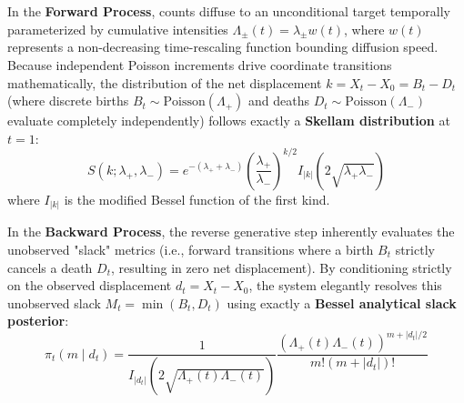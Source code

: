 \documentclass{article}
\begin{document}
In the \textbf{Forward Process}, counts diffuse to an unconditional target temporally parameterized by cumulative intensities \(\Lambda_{\pm}(t) = \lambda_{\pm} w(t)\), where \(w(t)\) represents a non-decreasing time-rescaling function bounding diffusion speed. Because independent Poisson increments drive coordinate transitions mathematically, the distribution of the net displacement \(k = X_t - X_0 = B_t - D_t\) (where discrete births \(B_t \sim \text{Poisson}(\Lambda_+)\) and deaths \(D_t \sim \text{Poisson}(\Lambda_-)\) evaluate completely independently) follows exactly a \textbf{Skellam distribution} at \(t=1\):
\[
S(k; \lambda_{+}, \lambda_{-}) = e^{-(\lambda_{+} + \lambda_{-})} \left(\frac{\lambda_{+}}{\lambda_{-}}\right)^{k/2} I_{|k|}(2\sqrt{\lambda_{+} \lambda_{-}})
\]
where \(I_{|k|}\) is the modified Bessel function of the first kind.

In the \textbf{Backward Process}, the reverse generative step inherently evaluates the unobserved "slack" metrics (i.e., forward transitions where a birth \(B_t\) strictly cancels a death \(D_t\), resulting in zero net displacement). By conditioning strictly on the observed displacement \(d_t = X_t - X_0\), the system elegantly resolves this unobserved slack \(M_t = \min(B_t, D_t)\) using exactly a \textbf{Bessel analytical slack posterior}:
\[
\pi_t(m \mid d_t) = \frac{1}{I_{|d_t|}(2 \sqrt{\Lambda_+(t) \Lambda_-(t)})} \frac{(\Lambda_+(t) \Lambda_-(t))^{m + |d_t|/2}}{m! (m + |d_t|)!}
\]
\end{document}
